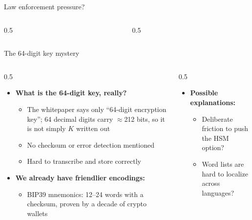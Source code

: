 \ifdefined\PRESENTATION\else\PassOptionsToClass{handout}{beamer}\fi\documentclass[aspectratio=169, lualatex]{beamer}
\begin{document}
\begin{frame}{Law enforcement pressure?}
	\begin{columns}[c]
		\begin{column}{0.5\textwidth}
		\end{column}
		\begin{column}{0.5\textwidth}
		\end{column}
	\end{columns}
\end{frame}

\begin{frame}{The 64-digit key mystery}
	\begin{columns}[c]
		\begin{column}{0.5\textwidth}
			\begin{itemize}
				\item \textbf{What is the 64-digit key, really?}
				      \begin{itemize}
					      \item The whitepaper says only ``64-digit encryption key''; 64 decimal digits carry ${\approx}$212 bits, so it is not simply $K$ written out
					      \item No checksum or error detection mentioned
					      \item Hard to transcribe and store correctly
				      \end{itemize}
				\item \textbf{We already have friendlier encodings:}
				      \begin{itemize}
					      \item BIP39 mnemonics: 12--24 words with a checksum, proven by a decade of crypto wallets
				      \end{itemize}
			\end{itemize}
		\end{column}
		\begin{column}{0.5\textwidth}
			\begin{itemize}
				\item \textbf{Possible explanations:}
				      \begin{itemize}
					      \item Deliberate friction to push the HSM option?
					      \item Word lists are hard to localize across languages?
				      \end{itemize}

\end{itemize}
\end{column}
\end{columns}
\end{frame}
\end{document}
